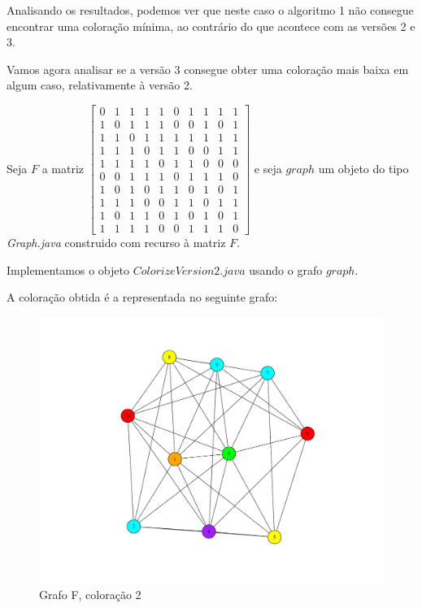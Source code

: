 \documentclass[a4paper,12pt]{report}
\begin{document}
Analisando os resultados, podemos ver que neste caso o algoritmo 1 não consegue encontrar uma coloração mínima, ao contrário do que acontece com as versões 2 e 3.

Vamos agora analisar se a versão 3 consegue obter uma coloração mais baixa em algum caso, relativamente à versão 2.

Seja $F$ a matriz 
$\begin{bmatrix}
    0&1&1&1&1&0&1&1&1&1\\
    1&0&1&1&1&0&0&1&0&1\\
    1&1&0&1&1&1&1&1&1&1\\
    1&1&1&0&1&1&0&0&1&1\\
    1&1&1&1&0&1&1&0&0&0\\
    0&0&1&1&1&0&1&1&1&0\\
    1&0&1&0&1&1&0&1&0&1\\
    1&1&1&0&0&1&1&0&1&1\\
    1&0&1&1&0&1&0&1&0&1\\
    1&1&1&1&0&0&1&1&1&0
\end{bmatrix}$ e seja $graph$ um objeto do tipo \textit{Graph.java} construido com recurso à matriz $F$.

Implementamos o objeto $ColorizeVersion2.java$ usando o grafo $graph$.

A coloração obtida é a representada no seguinte grafo:

\begin{figure}[H]
    \centering
        \includegraphics[scale=0.3]{img/v2F.pdf}
    \caption{Grafo F, coloração 2}
    \label{fig:v2F}
\end{figure}
\end{document}
